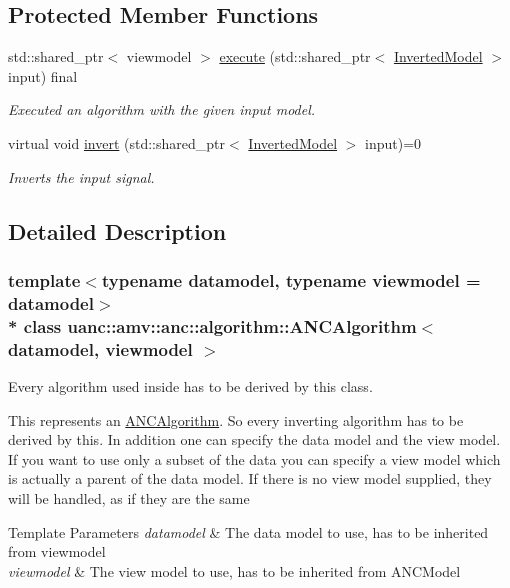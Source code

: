 \subsection*{Protected Member Functions}
\begin{DoxyCompactItemize}
\item 
std\+::shared\+\_\+ptr$<$ viewmodel $>$ \hyperlink{classuanc_1_1amv_1_1anc_1_1algorithm_1_1_a_n_c_algorithm_abe01c94fdf777d5081c54311b45341f8}{execute} (std\+::shared\+\_\+ptr$<$ \hyperlink{classuanc_1_1amv_1_1_inverted_model}{Inverted\+Model} $>$ input) final
\begin{DoxyCompactList}\small\item\em Executed an algorithm with the given input model. \end{DoxyCompactList}\item 
virtual void \hyperlink{classuanc_1_1amv_1_1anc_1_1algorithm_1_1_a_n_c_algorithm_abfdc7f14f7e41e408ee08037a839760d}{invert} (std\+::shared\+\_\+ptr$<$ \hyperlink{classuanc_1_1amv_1_1_inverted_model}{Inverted\+Model} $>$ input)=0
\begin{DoxyCompactList}\small\item\em Inverts the input signal. \end{DoxyCompactList}\end{DoxyCompactItemize}


\subsection{Detailed Description}
\subsubsection*{template$<$typename datamodel, typename viewmodel = datamodel$>$\\*
class uanc\+::amv\+::anc\+::algorithm\+::\+A\+N\+C\+Algorithm$<$ datamodel, viewmodel $>$}

Every algorithm used inside has to be derived by this class. 

This represents an \hyperlink{classuanc_1_1amv_1_1anc_1_1algorithm_1_1_a_n_c_algorithm}{A\+N\+C\+Algorithm}. So every inverting algorithm has to be derived by this. In addition one can specify the data model and the view model. If you want to use only a subset of the data you can specify a view model which is actually a parent of the data model. If there is no view model supplied, they will be handled, as if they are the same


\begin{DoxyTemplParams}{Template Parameters}
{\em datamodel} & The data model to use, has to be inherited from viewmodel \\
\hline
{\em viewmodel} & The view model to use, has to be inherited from A\+N\+C\+Model \\
\hline
\end{DoxyTemplParams}


